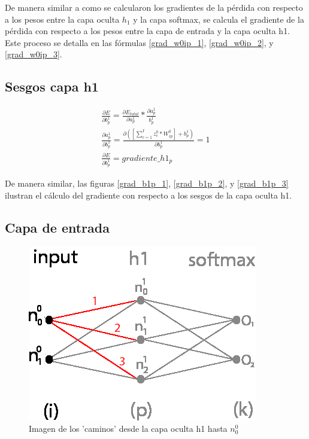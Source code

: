 De manera similar a como se calcularon los gradientes de la pérdida con respecto a los pesos entre la capa oculta $h_1$ y la capa softmax, se calcula el gradiente de la pérdida con respecto a los pesos entre la capa de entrada y la capa oculta h1. Este proceso se detalla en las fórmulas \ref{grad_w0ip_1}, \ref{grad_w0ip_2}, y \ref{grad_w0ip_3}.

\subsection{Sesgos capa h1}

\begin{gather}
	\frac{\partial E}{\partial b^1_p} = \frac{\partial E_{total} }{\partial a^1_p } * \frac{\partial a^1_p}{b^1_p} \label{grad_b1p_1} \\
	\frac{\partial a^1_p }{\partial b^1_p } = \frac{\partial ([\sum_{c=1}^{I} z^0_c * W^0_{ip}] + b^1_p) }{\partial b^1_p } = 1 \label{grad_b1p_2} \\
	\frac{\partial E}{\partial b^1_p} = gradiente\_h1_p
	\label{grad_b1p_3}
\end{gather}

De manera similar, las figuras \ref{grad_b1p_1}, \ref{grad_b1p_2}, y \ref{grad_b1p_3} ilustran el cálculo del gradiente con respecto a los sesgos de la capa oculta h1.

\subsection{Capa de entrada}

\begin{figure}[H]
	\centering
	\includegraphics[scale=0.35]{imagenes/nn_caminos_posibles_input.jpg}  
	\caption{Imagen de los 'caminos' desde la capa oculta h1 hasta $n^0_0$}
	\label{nn_caminos_posibles_input}
\end{figure}

